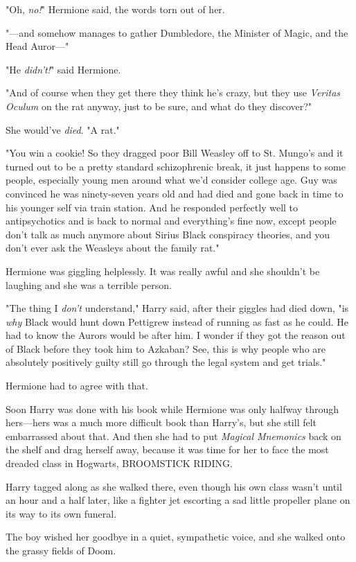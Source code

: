 "Oh, \emph{no!}" Hermione said, the words torn out of her.

"---and somehow manages to gather Dumbledore, the Minister of Magic, and the 
Head Auror---"

"He \emph{didn't!}" said Hermione.

"And of course when they get there they think he's crazy, but they use 
\emph{Veritas Oculum} on the rat anyway, just to be sure, and what do they 
discover?"

She would've \emph{died}. "A rat."

"You win a cookie! So they dragged poor Bill Weasley off to St. Mungo's and it 
turned out to be a pretty standard schizophrenic break, it just happens to some 
people, especially young men around what we'd consider college age. Guy was 
convinced he was ninety-seven years old and had died and gone back in time to 
his younger self via train station. And he responded perfectly well to 
antipsychotics and is back to normal and everything's fine now, except people 
don't talk as much anymore about Sirius Black conspiracy theories, and you 
don't ever ask the Weasleys about the family rat."

Hermione was giggling helplessly. It was really awful and she shouldn't be 
laughing and she was a terrible person.

"The thing I \emph{don't} understand," Harry said, after their giggles had died 
down, "is \emph{why} Black would hunt down Pettigrew instead of running as fast 
as he could. He had to know the Aurors would be after him. I wonder if they got 
the reason out of Black before they took him to Azkaban? See, this is why 
people who are absolutely positively guilty still go through the legal system 
and get trials."

Hermione had to agree with that.

Soon Harry was done with his book while Hermione was only halfway through 
hers---hers was a much more difficult book than Harry's, but she still felt 
embarrassed about that. And then she had to put \emph{Magical Mnemonics} back 
on the shelf and drag herself away, because it was time for her to face the 
most dreaded class in Hogwarts, BROOMSTICK RIDING.

Harry tagged along as she walked there, even though his own class wasn't until 
an hour and a half later, like a fighter jet escorting a sad little propeller 
plane on its way to its own funeral.

The boy wished her goodbye in a quiet, sympathetic voice, and she walked onto 
the grassy fields of Doom.

